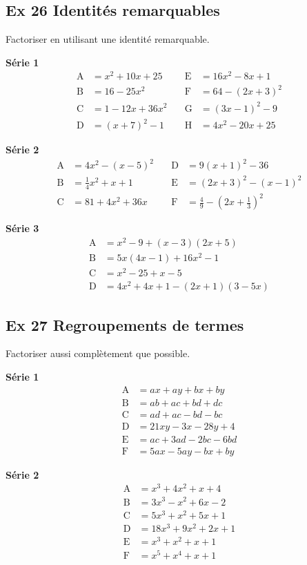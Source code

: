 \documentclass[a4paper,11pt]{article}
\begin{document}
\subsection*{Ex 26 \; Identités remarquables}
Factoriser en utilisant une identité remarquable.

\textbf{Série 1}
\[
\begin{aligned}
\mathrm{A}&=x^{2}+10x+25 &\quad \mathrm{E}&=16x^{2}-8x+1\\
\mathrm{B}&=16-25x^{2} &\quad \mathrm{F}&=64-(2x+3)^{2}\\
\mathrm{C}&=1-12x+36x^{2} &\quad \mathrm{G}&=(3x-1)^{2}-9\\
\mathrm{D}&=(x+7)^{2}-1 &\quad \mathrm{H}&=4x^{2}-20x+25
\end{aligned}
\]

\textbf{Série 2}
\[
\begin{aligned}
\mathrm{A}&=4x^{2}-(x-5)^{2} &\quad \mathrm{D}&=9(x+1)^{2}-36\\
\mathrm{B}&=\tfrac14 x^{2}+x+1 &\quad \mathrm{E}&=(2x+3)^{2}-(x-1)^{2}\\
\mathrm{C}&=81+4x^{2}+36x &\quad \mathrm{F}&=\tfrac{4}{9}-\left(2x+\tfrac13\right)^{2}
\end{aligned}
\]

\textbf{Série 3}
\[
\begin{aligned}
\mathrm{A}&=x^{2}-9+(x-3)(2x+5)\\
\mathrm{B}&=5x(4x-1)+16x^{2}-1\\
\mathrm{C}&=x^{2}-25+x-5\\
\mathrm{D}&=4x^{2}+4x+1-(2x+1)(3-5x)
\end{aligned}
\]


\subsection*{Ex 27 \; Regroupements de termes}
Factoriser aussi complètement que possible.

\textbf{Série 1}
\[
\begin{aligned}
\mathrm{A}&=ax+ay+bx+by\\
\mathrm{B}&=ab+ac+bd+dc\\
\mathrm{C}&=ad+ac-bd-bc\\
\mathrm{D}&=21xy-3x-28y+4\\
\mathrm{E}&=ac+3ad-2bc-6bd\\
\mathrm{F}&=5ax-5ay-bx+by
\end{aligned}
\]

\textbf{Série 2}
\[
\begin{aligned}
\mathrm{A}&=x^{3}+4x^{2}+x+4\\
\mathrm{B}&=3x^{3}-x^{2}+6x-2\\
\mathrm{C}&=5x^{3}+x^{2}+5x+1\\
\mathrm{D}&=18x^{3}+9x^{2}+2x+1\\
\mathrm{E}&=x^{3}+x^{2}+x+1\\
\mathrm{F}&=x^{5}+x^{4}+x+1
\end{aligned}
\]
\end{document}
